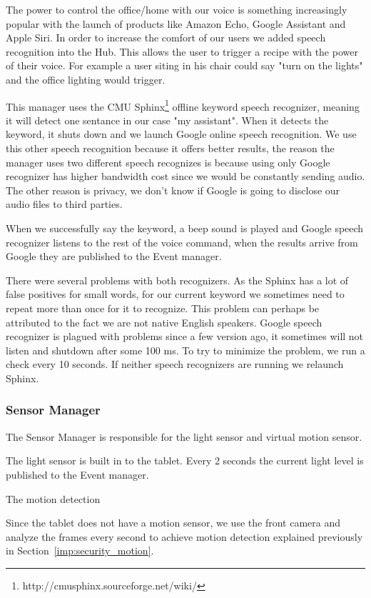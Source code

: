 The power to control the office/home with our voice is something increasingly popular with the launch of products like Amazon Echo, Google Assistant and Apple Siri. In order to increase the comfort of our users we added speech recognition into the Hub. This allows the user to trigger a recipe with the power of their voice. For example a user siting in his chair could say "turn on the lights" and the office lighting would trigger. 

This manager uses the CMU Sphinx\footnote{http://cmusphinx.sourceforge.net/wiki/} offline keyword speech recognizer, meaning it will detect one sentance in our case "my assistant". When it detects the keyword, it shuts down and we launch Google online speech recognition. We use this other speech recognition because it offers better results, the reason the manager uses two different speech recognizes is because using only Google recognizer has higher bandwidth cost since we would be constantly sending audio. The other reason is privacy, we don't know if Google is going to disclose our audio files to third parties.

When we successfully say the keyword, a beep sound is played and Google speech recognizer listens to the rest of the voice command, when the results arrive from Google they are published to the Event manager.

There were several problems with both recognizers. As the Sphinx has a lot of false positives for small words, for our current keyword we sometimes need to repeat more than once for it to recognize. This problem can perhaps be attributed to the fact we are not native English speakers. 
Google speech recognizer is plagued with problems since a few version ago, it sometimes will not listen and shutdown after some 100 ms. To try to minimize the problem, we run a check every 10 seconds. If neither speech recognizers are running we relaunch Sphinx.

\subsubsection{Sensor Manager}\label{sensor_manager_imp}

The Sensor Manager is responsible for the light sensor and virtual motion sensor.

The light sensor is built in to the tablet. Every 2 seconds the current light level is published to the Event manager. 

The motion detection 

Since the tablet does not have a motion sensor, we use the front camera and analyze the frames every second to achieve motion detection explained previously in Section~\ref{imp:security_motion}.

